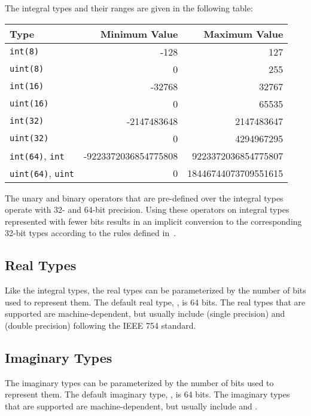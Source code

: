 The integral types and their ranges are given in the following table:

\begin{center}
\begin{tabular}{|l|r|r|}
\hline
{\bf Type} & {\bf Minimum Value} & {\bf Maximum Value} \\
\hline
{\tt int(8)} & -128 & 127 \\
{\tt uint(8)} & 0 & 255 \\
{\tt int(16)} & -32768 & 32767 \\
{\tt uint(16)} & 0 & 65535 \\
{\tt int(32)} & -2147483648 & 2147483647 \\
{\tt uint(32)} & 0 & 4294967295 \\
{\tt int(64)}, {\tt int} & -9223372036854775808 & 9223372036854775807 \\
{\tt uint(64)}, {\tt uint} & 0 & 18446744073709551615 \\
\hline
\end{tabular}
\end{center}

The unary and binary operators that are pre-defined over the integral
types operate with 32- and 64-bit precision.  Using these operators on
integral types represented with fewer bits results in an implicit
conversion to the corresponding 32-bit types
according to the rules defined in~.


\subsection{Real Types}
\label{Real_Types}

Like the integral types, the real types can be parameterized by the
number of bits used to represent them.  The default real
type, , is 64 bits.  The real types that are supported are
machine-dependent, but usually include  (single
precision) and  (double precision) following the IEEE
754 standard.  

\subsection{Imaginary Types}
\label{Imaginary_Types}

The imaginary types can be parameterized by the number of bits used to
represent them.  The default imaginary type, , is 64 bits.
The imaginary types that are supported are machine-dependent, but
usually include  and .

